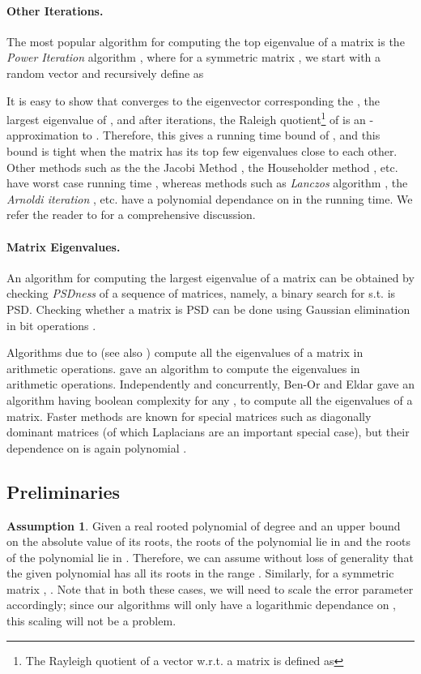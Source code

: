 \documentclass{article}[12pt]
\theoremstyle{definition}
\newtheorem{assumption}[theorem]{Assumption}
\begin{document}
\paragraph{Other Iterations.}
The most popular algorithm for computing the top eigenvalue of a matrix is the 
{\em Power Iteration} algorithm \cite{mp29}, where for a symmetric matrix ,
we start with a random vector  and recursively define  as
 
It is easy to show that  converges to the eigenvector corresponding the , the largest 
eigenvalue of , and after  iterations, the Raleigh 
quotient\footnote{The Rayleigh quotient of a vector  w.r.t. a matrix  is defined as 
 } 
of   is an -approximation to . Therefore, this gives a running time
bound of , and this bound is tight when the matrix has its top few 
eigenvalues close to each other. 
Other methods such as the the Jacobi Method \cite{r71}, the Householder method \cite{h70}, etc. 
have worst case running time , whereas methods such as 
{\em Lanczos} algorithm \cite{l50}, the {\em Arnoldi iteration} \cite{a51}, etc.
have a polynomial dependance on  in the running time.
We refer the reader to \cite{ptvf92} for a comprehensive discussion.

\paragraph{Matrix Eigenvalues.}
An algorithm for computing the largest eigenvalue of a matrix 
can be obtained by checking {\em PSDness} of a sequence of matrices, namely, a binary search 
for  s.t.  is PSD. Checking whether a matrix is PSD can be done using Gaussian elimination 
in  bit operations \cite{e67}.

Algorithms due to \cite{pc99} (see also \cite{nh13}) compute all the eigenvalues of a matrix
in  arithmetic operations. \cite{ddh07} gave an algorithm to compute the eigenvalues
in  arithmetic operations.
Independently and concurrently, Ben-Or and Eldar \cite{be15} gave an algorithm
having boolean complexity  for any ,  
to compute all the eigenvalues of a matrix.
Faster methods are known for special matrices 
such as diagonally dominant matrices (of which Laplacians are an important special case), but their dependence 
on  is again polynomial \cite{v13}. 





\subsection{Preliminaries}
\label{sec:simpleass}
\begin{assumption}
\label{ass:root1}
Given a real rooted polynomial  of degree  and an upper bound  on the absolute value of its roots, 
the roots of the polynomial  lie in 
and the roots of the polynomial  lie in . 
Therefore, we can assume without loss of generality that the given polynomial has all its roots in the 
range .
Similarly, for a symmetric matrix , . 
Note that in both these cases, we will need to scale the error parameter  accordingly;
since our algorithms will only have a logarithmic dependance on , this scaling
will not be a problem.
\end{assumption}
\end{document}
